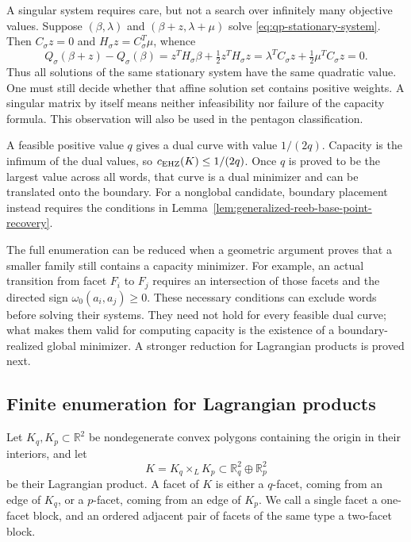 A singular system requires care, but not a search over infinitely many
objective values. Suppose $(\beta,\lambda)$ and
$(\beta+z,\lambda+\mu)$ solve \eqref{eq:qp-stationary-system}. Then
$C_\sigma z=0$ and $H_\sigma z=C_\sigma^T\mu$, whence
\[
 Q_\sigma(\beta+z)-Q_\sigma(\beta)
 =z^TH_\sigma\beta+\tfrac12z^TH_\sigma z
 =\lambda^TC_\sigma z+\tfrac12\mu^TC_\sigma z=0.
\]
Thus all solutions of the same stationary system have the same quadratic
value. One must still decide whether that affine solution set contains
positive weights. A singular matrix by itself means neither infeasibility
nor failure of the capacity formula. This observation will also be used
in the pentagon classification.

A feasible positive value $q$ gives a dual curve with value $1/(2q)$.
Capacity is the infimum of the dual values, so
$c_{\rm EHZ}(K)\leq1/(2q)$. Once $q$ is proved to
be the largest value across all words, that curve is a dual minimizer and
can be translated onto the boundary. For a nonglobal candidate, boundary
placement instead requires the conditions in
Lemma~\ref{lem:generalized-reeb-base-point-recovery}.

The full enumeration can be reduced when a geometric argument proves that
a smaller family still contains a capacity minimizer. For example, an
actual transition from facet $F_i$ to $F_j$ requires an intersection of
those facets and the directed sign $\omega_0(a_i,a_j)\geq0$. These
necessary conditions can exclude words before solving their systems.
They need not hold for every feasible dual curve; what makes them valid
for computing capacity is the existence of a boundary-realized global
minimizer. A stronger reduction for Lagrangian products is proved next.

\subsection{Finite enumeration for Lagrangian products}
\label{subsec:quadratic-program-algorithm-hk2019-lagrangian-products}

Let \(K_q,K_p\subset\mathbb{R}^2\) be nondegenerate convex polygons containing
the origin in their interiors, and let
\[
  K=K_q\times_L K_p\subset\mathbb{R}^2_q\oplus\mathbb{R}^2_p
\]
be their Lagrangian product. A facet of \(K\) is either a \(q\)-facet,
coming from an edge of \(K_q\), or a \(p\)-facet, coming from an edge of
\(K_p\). We call a single facet a one-facet block, and an ordered adjacent pair
of facets of the same type a two-facet block.


